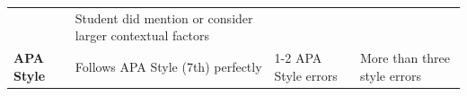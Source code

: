 \documentclass[
  openany]{book}
\begin{document}
\begin{longtable}[]{@{}llll@{}}
\begin{minipage}[t]{0.22\columnwidth}
\end{minipage} & \begin{minipage}[t]{0.22\columnwidth}\raggedright
Student did mention or consider larger contextual factors\strut
\end{minipage}\tabularnewline
\begin{minipage}[t]{0.22\columnwidth}\raggedright
\textbf{APA Style}\strut
\end{minipage} & \begin{minipage}[t]{0.22\columnwidth}\raggedright
Follows APA Style (7th) perfectly\strut
\end{minipage} & \begin{minipage}[t]{0.22\columnwidth}\raggedright
1-2 APA Style errors\strut
\end{minipage} & \begin{minipage}[t]{0.22\columnwidth}\raggedright
More than three style errors\strut
\end{minipage}\tabularnewline
\bottomrule
\end{longtable}
\end{document}
